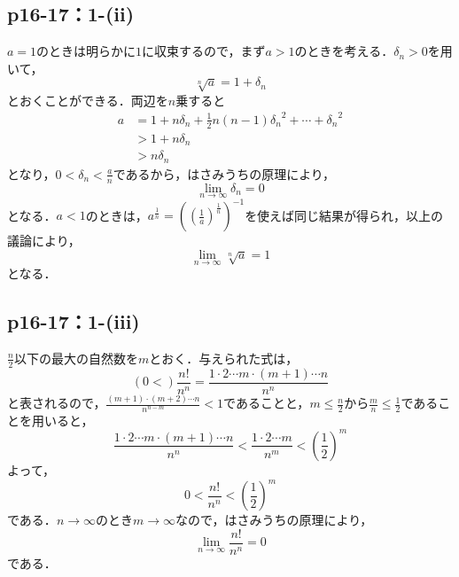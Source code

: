 \documentclass[a4paper,10pt,fleqn]{ltjsarticle}
\begin{document}
\subsection*{p16-17：1-(ii)}

\begin{tleftbar}
    $a=1$のときは明らかに$1$に収束するので，まず$a>1$のときを考える．$\delta_n >0$を用いて，
    \[
        \sqrt[n]{a} =1+\delta_n
    \]
    とおくことができる．両辺を$n$乗すると
    \begin{align*}
        a& = 1+ n \delta_n + \frac{1}{2}n(n-1) {\delta_n}^2 + \cdots + {\delta_n}^2 \\
        &>1+n \delta_n \\
        & >n \delta_n
    \end{align*}
    となり，$0<\delta_n <\frac{a}{n}$であるから，はさみうちの原理により，
    \[
        \lim_{n \to \infty} \delta_n =0
    \]
    となる．$a<1$のときは，$a^{\frac{1}{n}}=\left(\left(\frac{1}{a}\right)^{\frac{1}{n}}\right)^{-1}$を使えば同じ結果が得られ，以上の議論により，
    \[
        \lim_{n \to \infty} \sqrt[n]{a} =1
    \]
    となる．
\end{tleftbar}

\subsection*{p16-17：1-(iii)}

\begin{tleftbar}
    $\frac{n}{2}$以下の最大の自然数を$m$とおく．与えられた式は，
    \[
       \left( 0  < \right) \frac{n!}{n^n}  = \frac{1 \cdot 2 \dotsm m \cdot (m+1) \dotsm n}{n^n}
    \]
    と表されるので，$\frac{(m+1) \cdot (m+2) \dotsm n}{n^{n-m}} <1$であることと，$m \le \frac{n}{2}$から$\frac{m}{n} \le \frac{1}{2}$であることを用いると，
    \[
        \frac{1 \cdot 2 \dotsm m \cdot (m+1) \dotsm n}{n^n} < \frac{1 \cdot 2 \dotsm m}{n^m} <\left(\frac{1}{2}\right)^m
    \]
    よって，
    \[
        0 < \frac{n!}{n^n} <\left(\frac{1}{2}\right)^m
    \]
    である．$n \to \infty$のとき$m \to \infty$なので，はさみうちの原理により，
    \[
        \lim_{n \to \infty}\frac{n!}{n^n} =0
    \]
    である．
\end{tleftbar}
\end{document}
